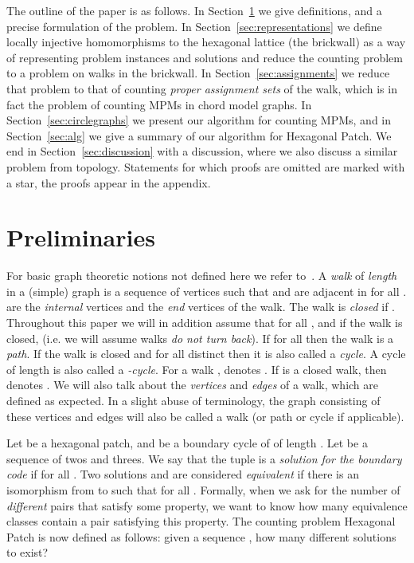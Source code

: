 \documentclass{llncs}
\def\notat#1{{}\marginpar{\raggedright{\small }}}
\def\term#1{{\em #1}\marginpar{\raggedright{\small\it #1}}}
\begin{document}
The outline of the paper is as follows. In Section~\ref{sec:prelim} we give definitions, and a precise formulation of the problem. In Section~\ref{sec:representations} we define locally injective homomorphisms to the hexagonal lattice (the brickwall) as a way of representing problem instances and solutions and reduce the counting problem to a problem on walks in the brickwall. 
In Section~\ref{sec:assignments} we reduce that problem to that of counting {\em proper assignment sets} of the walk, which is in fact the problem of counting MPMs in chord model graphs.
In Section~\ref{sec:circlegraphs} we present our algorithm for counting MPMs, and in Section~\ref{sec:alg} we give a summary of our algorithm for Hexagonal Patch.
We end in Section~\ref{sec:discussion} with a discussion, where we also discuss a similar problem from topology.
Statements for which proofs are omitted are marked with a star, the proofs appear in the appendix.




\section{Preliminaries}
\label{sec:prelim}



For basic graph theoretic notions not defined here we refer to~\cite{Die}.
A \term{walk} of {\em length } in a (simple) graph  is a sequence of  vertices  such that  and  are adjacent in  for all .
 are the \term{internal} vertices and  the \term{end} vertices of the walk. The walk is \term{closed} if .
Throughout this paper we will in addition assume that  for all , and if the walk is closed,  (i.e. we will assume walks {\em do not turn back}).
If  for all  
then the walk is a \term{path}. If the walk is closed and  for all distinct  then it is also called a \term{cycle}. A cycle of length  is also called a \term{-cycle}.
For a walk , \notat{W_x} denotes .
If  is a closed walk, then  denotes . 
We will also talk about the {\em vertices} and {\em edges} of a walk, which are defined as expected. In a slight abuse of terminology, the graph consisting of these vertices and edges will also be called a walk (or path or cycle if applicable).





Let  be a hexagonal patch, and  be a boundary cycle of  of length . Let  be a sequence of twos and threes. We say that the tuple  is a {\em solution for the boundary code } if  for all .
Two solutions  and  are considered \term{equivalent} if there is an isomorphism  from  to  such that  for all .
Formally, when we ask for the number of {\em different} pairs  that satisfy some property, we want to know how many equivalence classes contain a pair  satisfying this property.
The counting problem Hexagonal Patch is now defined as follows: given a sequence , how many different solutions  to  exist?
\end{document}
